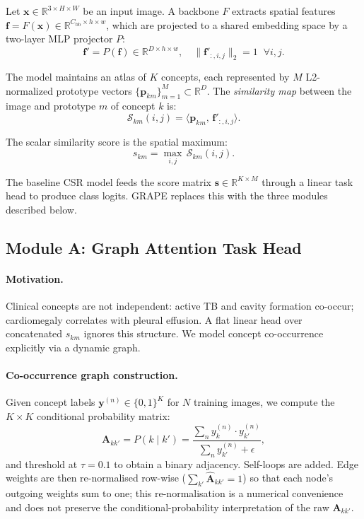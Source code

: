 \documentclass{article}
\begin{document}
Let $\mathbf{x} \in \mathbb{R}^{3 \times H \times W}$ be an input image. A backbone $F$ extracts spatial features $\mathbf{f} = F(\mathbf{x}) \in \mathbb{R}^{C_{\text{bb}} \times h \times w}$, which are projected to a shared embedding space by a two-layer MLP projector $P$:
\begin{equation}
    \mathbf{f}' = P(\mathbf{f}) \in \mathbb{R}^{D \times h \times w}, \quad \|\mathbf{f}'_{:,i,j}\|_2 = 1 \;\;\forall i,j.
\end{equation}

The model maintains an atlas of $K$ concepts, each represented by $M$ L2-normalized prototype vectors $\{\mathbf{p}_{km}\}_{m=1}^M \subset \mathbb{R}^D$. The \emph{similarity map} between the image and prototype $m$ of concept $k$ is:
\begin{equation}
    \mathcal{S}_{km}(i,j) = \langle \mathbf{p}_{km},\, \mathbf{f}'_{:,i,j} \rangle.
\end{equation}

The scalar similarity score is the spatial maximum:
\begin{equation}
    s_{km} = \max_{i,j}\, \mathcal{S}_{km}(i,j).
    \label{eq:sim_score}
\end{equation}

The baseline CSR model feeds the score matrix $\mathbf{s} \in \mathbb{R}^{K \times M}$ through a linear task head to produce class logits. GRAPE replaces this with the three modules described below.

\subsection{Module A: Graph Attention Task Head}
\label{sec:gnn}

\paragraph{Motivation.} Clinical concepts are not independent: active TB and cavity formation co-occur; cardiomegaly correlates with pleural effusion. A flat linear head over concatenated $s_{km}$ ignores this structure. We model concept co-occurrence explicitly via a dynamic graph.

\paragraph{Co-occurrence graph construction.}
Given concept labels $\mathbf{y}^{(n)} \in \{0,1\}^K$ for $N$ training images, we compute the $K \times K$ conditional probability matrix:
\begin{equation}
    \mathbf{A}_{kk'} = P(k \mid k') = \frac{\sum_{n} y^{(n)}_k \cdot y^{(n)}_{k'}}{\sum_{n} y^{(n)}_{k'} + \epsilon},
\end{equation}
and threshold at $\tau=0.1$ to obtain a binary adjacency. Self-loops are added. Edge weights are then re-normalised row-wise ($\sum_{k'} \hat{\mathbf{A}}_{kk'} = 1$) so that each node's outgoing weights sum to one; this re-normalisation is a numerical convenience and does not preserve the conditional-probability interpretation of the raw $\mathbf{A}_{kk'}$.
\end{document}
